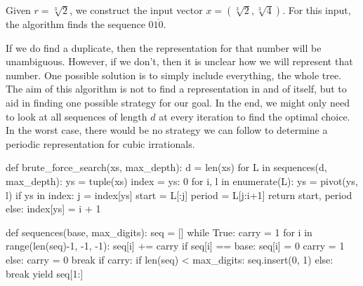 \begin{example}
  Given $r = \sqrt[3]{2}$, we construct the input vector $x = \left(\sqrt[3]{2}, \sqrt[3]{4}\right)$.
  For this input, the algorithm finds the sequence $0\overline{10}$.

\end{example}



If we do find a duplicate, then the representation for that number will be unambiguous.
However, if we don't, then it is unclear how we will represent that number.
One possible solution is to simply include everything, the whole tree.
The aim of this algorithm is not to find a representation in and of itself,
but to aid in finding one possible strategy for our goal.
In the end, we might only need to look at all sequences of length $d$ at every
iteration to find the optimal choice.
In the worst case, there would be no strategy we can follow to determine a
periodic representation for cubic irrationals.


\begin{minipage}{0.48\textwidth}
\begin{Python}[basicstyle=\tiny\ttfamily, frame={}]
def brute_force_search(xs, max_depth):
    d = len(xs)
    for L in sequences(d, max_depth):
        ys = tuple(xs)
        index = {ys: 0}
        for i, l in enumerate(L):
            ys = pivot(ys, l)
            if ys in index:
                j = index[ys]
                start = L[:j]
                period = L[j:i+1]
                return start, period
            else:
                index[ys] = i + 1
\end{Python}
\end{minipage}
\vrule width 1pt
\hfill
\begin{minipage}{0.48\textwidth}
\begin{Python}[basicstyle=\tiny\ttfamily, frame={}]
def sequences(base, max_digits):
    seq = []
    while True:
        carry = 1
        for i in range(len(seq)-1, -1, -1):
            seq[i] += carry
            if seq[i] == base:
                seq[i] = 0
                carry = 1
            else:
                carry = 0
                break
        if carry:
            if len(seq) < max_digits:
                seq.insert(0, 1)
            else:
                break
        yield seq[1:]
\end{Python}
\end{minipage}

